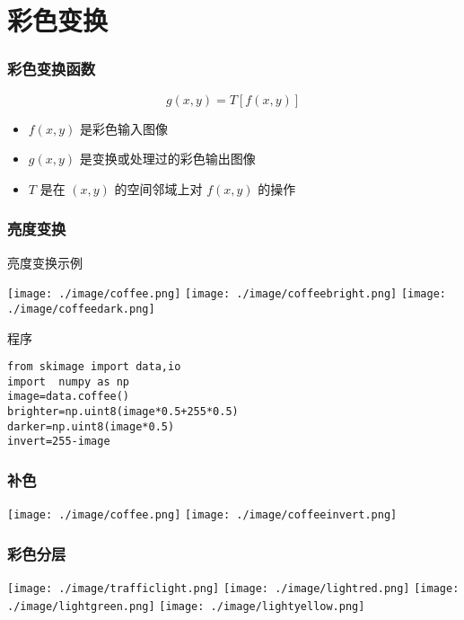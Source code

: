 \documentclass{beamer}
\begin{document}
\section{彩色变换}
\label{sec-5}
\begin{frame}
\frametitle{彩色变换函数}
\label{sec-5-1}


   \[ g(x,y)=T[f(x,y)] \]

\begin{itemize}
\item $f(x,y)$ 是彩色输入图像
\item $g(x,y)$ 是变换或处理过的彩色输出图像
\item $T$ 是在 $(x,y)$ 的空间邻域上对 $f(x,y)$ 的操作
\end{itemize}
\end{frame}
\begin{frame}[fragile]
\frametitle{亮度变换}
\label{sec-5-2}
\begin{block}{亮度变换示例}
\label{sec-5-2-1}

\texttt{[image: ./image/coffee.png]}
\texttt{[image: ./image/coffeebright.png]}
\texttt{[image: ./image/coffeedark.png]}
\end{block}
\begin{block}{程序}
\label{sec-5-2-2}


\begin{verbatim}
from skimage import data,io
import  numpy as np
image=data.coffee()
brighter=np.uint8(image*0.5+255*0.5)
darker=np.uint8(image*0.5)
invert=255-image
\end{verbatim}
\end{block}
\end{frame}
\begin{frame}
\frametitle{补色}
\label{sec-5-3}

\texttt{[image: ./image/coffee.png]}
\texttt{[image: ./image/coffeeinvert.png]}
\end{frame}
\begin{frame}
\frametitle{彩色分层}
\label{sec-5-4}

\texttt{[image: ./image/trafficlight.png]}
\texttt{[image: ./image/lightred.png]}
\texttt{[image: ./image/lightgreen.png]}
\texttt{[image: ./image/lightyellow.png]}
\end{frame}
\end{document}
